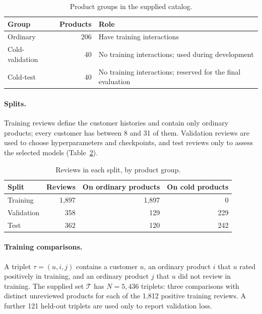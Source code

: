 \documentclass[12pt,a4paper]{article}
\begin{document}
\begin{table}[H]
\centering
\caption{Product groups in the supplied catalog.}
\label{tab:catalogs}
\begin{tabular}{lrl}
\toprule
Group & Products & Role \\
\midrule
Ordinary & 206 & Have training interactions \\
Cold-validation & 40 & No training interactions; used during development \\
Cold-test & 40 & No training interactions; reserved for the final evaluation \\
\bottomrule
\end{tabular}
\end{table}

\paragraph{Splits.} Training reviews define the customer histories and contain
only ordinary products; every customer has between 8 and 31 of them.
Validation reviews are used to choose hyperparameters and checkpoints, and
test reviews only to assess the selected models
(Table~\ref{tab:splits}).

\begin{table}[H]
\centering
\caption{Reviews in each split, by product group.}
\label{tab:splits}
\begin{tabular}{lrrr}
\toprule
Split & Reviews & On ordinary products & On cold products \\
\midrule
Training & 1{,}897 & 1{,}897 & 0 \\
Validation & 358 & 129 & 229 \\
Test & 362 & 120 & 242 \\
\bottomrule
\end{tabular}
\end{table}

\paragraph{Training comparisons.} A triplet $\tau = (u, i, j)$ contains a
customer $u$, an ordinary product $i$ that $u$ rated positively in training,
and an ordinary product $j$ that $u$ did not review in training. The supplied
set $\mathcal{T}$ has $N = 5{,}436$ triplets: three comparisons with distinct
unreviewed products for each of the 1{,}812 positive training reviews. A
further 121 held-out triplets are used only to report validation loss.
\end{document}
